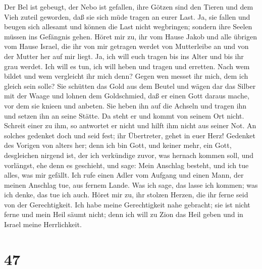  Der Bel ist gebeugt, der Nebo ist gefallen, ihre Götzen
sind den Tieren und dem Vieh zuteil geworden, daß sie sich müde tragen
an eurer Last.  Ja, sie fallen und beugen sich allesamt und
können die Last nicht wegbringen; sondern ihre Seelen müssen ins
Gefängnis gehen.  Höret mir zu, ihr vom Hause Jakob und alle
übrigen vom Hause Israel, die ihr von mir getragen werdet von
Mutterleibe an und von der Mutter her auf mir liegt.  Ja,
ich will euch tragen bis ins Alter und bis ihr grau werdet. Ich will es
tun, ich will heben und tragen und erretten.  Nach wem
bildet und wem vergleicht ihr mich denn? Gegen wen messet ihr mich, dem
ich gleich sein solle?  Sie schütten das Gold aus dem Beutel
und wägen dar das Silber mit der Waage und lohnen dem Goldschmied, daß
er einen Gott daraus mache, vor dem sie knieen und anbeten. 
Sie heben ihn auf die Achseln und tragen ihn und setzen ihn an seine
Stätte. Da steht er und kommt von seinem Ort nicht. Schreit einer zu
ihm, so antwortet er nicht und hilft ihm nicht aus seiner Not.
 An solches gedenket doch und seid fest; ihr Übertreter,
gehet in euer Herz!  Gedenket des Vorigen von alters her;
denn ich bin Gott, und keiner mehr, ein Gott, desgleichen nirgend ist,
 der ich verkündige zuvor, was hernach kommen soll, und
vorlängst, ehe denn es geschieht, und sage: Mein Anschlag besteht, und
ich tue alles, was mir gefällt.  Ich rufe einen Adler vom
Aufgang und einen Mann, der meinen Anschlag tue, aus fernem Lande. Was
ich sage, das lasse ich kommen; was ich denke, das tue ich auch.
 Höret mir zu, ihr stolzen Herzen, die ihr ferne seid von
der Gerechtigkeit.  Ich habe meine Gerechtigkeit nahe
gebracht; sie ist nicht ferne und mein Heil säumt nicht; denn ich will
zu Zion das Heil geben und in Israel meine Herrlichkeit.

\hypertarget{section-46}{%
\section{47}\label{section-46}}

